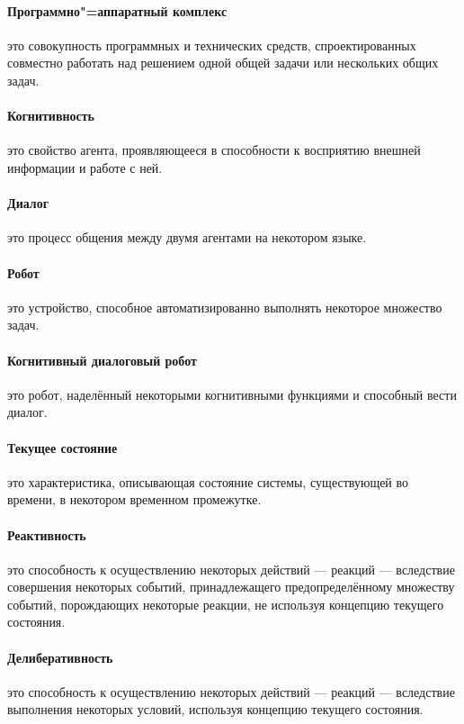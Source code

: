 \paragraph*{Программно"=аппаратный комплекс} это совокупность программных и технических средств, спроектированных совместно работать над решением одной общей задачи или нескольких общих задач.

\paragraph*{Когнитивность} это свойство агента, проявляющееся в способности к восприятию внешней информации и работе с ней.

\paragraph*{Диалог} это процесс общения между двумя агентами на некотором языке.

\paragraph*{Робот} это устройство, способное автоматизированно выполнять некоторое множество задач.

\paragraph*{Когнитивный диалоговый робот} это робот, наделённый некоторыми когнитивными функциями и способный вести диалог.

\paragraph*{Текущее состояние} это характеристика, описывающая состояние системы, существующей во времени, в некотором временном промежутке.

\paragraph*{Реактивность} это способность к осуществлению некоторых действий --- реакций --- вследствие совершения некоторых событий, принадлежащего предопределённому множеству событий, порождающих некоторые реакции, не используя концепцию текущего состояния.
\paragraph*{Делиберативность} это способность к осуществлению некоторых действий --- реакций --- вследствие выполнения некоторых условий, используя концепцию текущего состояния.

